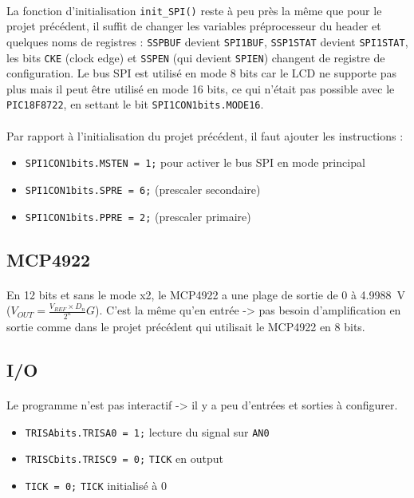 \documentclass{article}
\begin{document}
        \paragraph{}
        La fonction d'initialisation \texttt{init\_SPI()} reste à peu près la même que pour le projet précédent, il suffit de changer les variables préprocesseur du header et quelques noms de registres : \texttt{SSPBUF} devient \texttt{SPI1BUF}, \texttt{SSP1STAT} devient \texttt{SPI1STAT}, les bits \texttt{CKE} (clock edge) et \texttt{SSPEN} (qui devient \texttt{SPIEN}) changent de registre de configuration. Le bus SPI est utilisé en mode 8 bits car le LCD ne supporte pas plus mais il peut être utilisé en mode 16 bits, ce qui n'était pas possible avec le \texttt{PIC18F8722}, en settant le bit \texttt{SPI1CON1bits.MODE16}.

        \paragraph{}
        Par rapport à l'initialisation du projet précédent, il faut ajouter les instructions :
        \begin{itemize}
            \item \texttt{SPI1CON1bits.MSTEN = 1;} pour activer le bus SPI en mode principal
            \item \texttt{SPI1CON1bits.SPRE = 6;} (prescaler secondaire)
            \item \texttt{SPI1CON1bits.PPRE = 2;} (prescaler primaire)
        \end{itemize}


        \subsection{MCP4922}
        \paragraph{}
        En 12 bits et sans le mode x2, le MCP4922 a une plage de sortie de 0 à \SI{4.9988}{\volt} ($V_{OUT} = \frac{V_{REF} \times D_n}{2^n} G$). C'est la même qu'en entrée -> pas besoin d'amplification en sortie comme dans le projet précédent qui utilisait le MCP4922 en 8 bits.


        \subsection{I/O}
        \paragraph{}
        Le programme n'est pas interactif -> il y a peu d'entrées et sorties à configurer.
        \begin{itemize}
            \item \texttt{TRISAbits.TRISA0 = 1;} lecture du signal sur \texttt{AN0}
            \item \texttt{TRISCbits.TRISC9 = 0;} \texttt{TICK} en output
            \item \texttt{TICK = 0;} \texttt{TICK} initialisé à 0
        \end{itemize}
\end{document}
